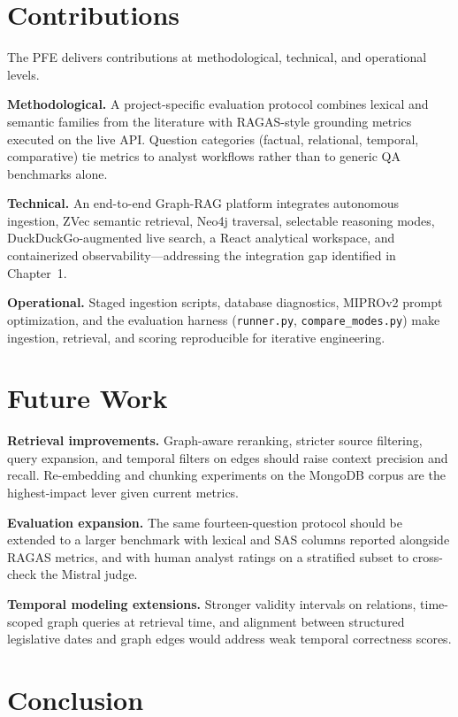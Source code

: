 \section{Contributions}

The PFE delivers contributions at methodological, technical, and operational levels.

\textbf{Methodological.} A project-specific evaluation protocol combines lexical and semantic families from the literature with RAGAS-style grounding metrics executed on the live API. Question categories (factual, relational, temporal, comparative) tie metrics to analyst workflows rather than to generic QA benchmarks alone.

\textbf{Technical.} An end-to-end Graph-RAG platform integrates autonomous ingestion, ZVec semantic retrieval, Neo4j traversal, selectable reasoning modes, DuckDuckGo-augmented live search, a React analytical workspace, and containerized observability---addressing the integration gap identified in Chapter~1.

\textbf{Operational.} Staged ingestion scripts, database diagnostics, MIPROv2 prompt optimization, and the evaluation harness (\texttt{runner.py}, \texttt{compare\_modes.py}) make ingestion, retrieval, and scoring reproducible for iterative engineering.

\section{Future Work}

\textbf{Retrieval improvements.} Graph-aware reranking, stricter source filtering, query expansion, and temporal filters on edges should raise context precision and recall. Re-embedding and chunking experiments on the MongoDB corpus are the highest-impact lever given current metrics.

\textbf{Evaluation expansion.} The same fourteen-question protocol should be extended to a larger benchmark with lexical and SAS columns reported alongside RAGAS metrics, and with human analyst ratings on a stratified subset to cross-check the Mistral judge.

\textbf{Temporal modeling extensions.} Stronger validity intervals on relations, time-scoped graph queries at retrieval time, and alignment between structured legislative dates and graph edges would address weak temporal correctness scores.

\section{Conclusion}

